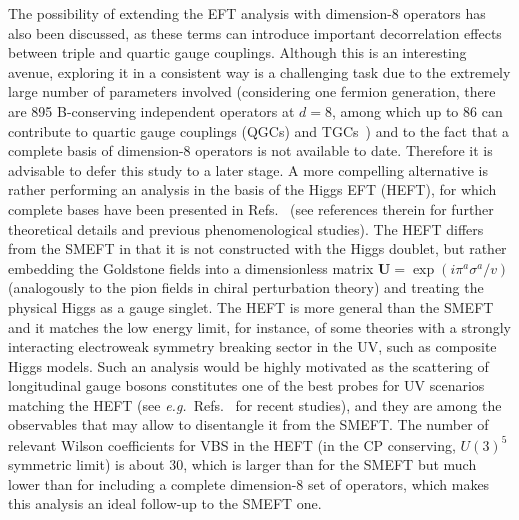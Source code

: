 The possibility of extending the EFT analysis with dimension-8 operators has also been discussed, as these terms can introduce important decorrelation effects between triple and quartic gauge couplings.
Although this is an interesting avenue, exploring it in a consistent way is a challenging task due to the extremely large number of parameters involved 
(considering one fermion generation, there are 895 B-conserving independent operators at $d=8$, among which up to 86 can contribute to quartic gauge couplings (QGCs) and TGCs~\cite{Henning:2015alf}) 
and to the fact that a complete basis of dimension-8 operators is not available to date. 
Therefore it is advisable to defer this study to a later stage. A more compelling alternative is rather performing an analysis in the basis of the Higgs EFT (HEFT), 
for which complete bases have been presented in Refs.~\cite{Buchalla:2013rka,Brivio:2016fzo} (see references therein for further theoretical details and previous phenomenological studies).
The HEFT differs from the SMEFT in that it is not 
constructed with the Higgs doublet, but rather embedding the Goldstone fields into a dimensionless matrix $\mathbf{U}=\exp(i\pi^a\sigma^a/v)$ (analogously to the pion fields in chiral perturbation theory) and treating the physical Higgs as a gauge singlet. The HEFT is more general than the SMEFT and it matches the low energy limit, for instance, of some theories with a strongly interacting electroweak symmetry breaking sector in the UV, such as composite Higgs models.
Such an analysis would be highly motivated as the scattering of longitudinal gauge bosons constitutes one of the best probes for UV scenarios matching the HEFT (see \emph{e.g.}\ Refs.~\cite{Delgado:2013hxa,Delgado:2014jda} for recent studies), and they are among the observables that may allow to disentangle it from the SMEFT. The number of relevant Wilson coefficients for VBS in the HEFT (in the CP conserving, $U(3)^5$ symmetric limit) is about 30, which is larger than for the SMEFT but much lower than for including a complete dimension-8 set of operators, 
which makes this analysis an ideal follow-up to the SMEFT one.

